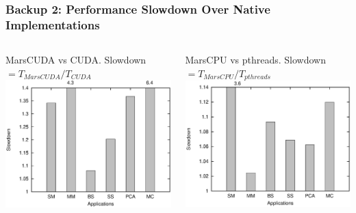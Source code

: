 \begin{frame}
\frametitle{Backup 2: Performance Slowdown Over Native Implementations}
\begin{columns}
\begin{block}{MarsCUDA vs CUDA. Slowdown $= T_{MarsCUDA}/T_{CUDA}$}
\includegraphics[width=1.0\linewidth]{figure/MarsGPU_CUDA.eps}
\end{block}
\begin{block}{MarsCPU vs pthreads. Slowdown $= T_{MarsCPU}/T_{pthreads}$}
\includegraphics[width=1.0\linewidth]{figure/MarsCPU_pthread.eps}
\end{block}
\end{columns}
\end{frame}
